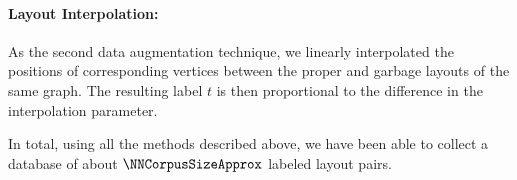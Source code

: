 \paragraph{Layout Interpolation:}
As the second data augmentation technique, we linearly interpolated the positions of corresponding vertices between the
proper and garbage layouts of the same graph.  The resulting label $t$ is then proportional to the difference in the
interpolation parameter.

\par\bigskip\noindent
In total, using all the methods described above, we have been able to collect a database of about
\ensuremath{\NNCorpusSizeApprox} labeled layout pairs.

